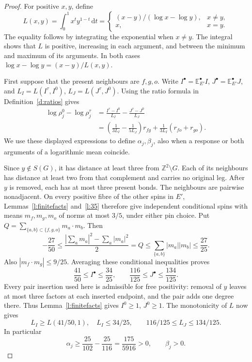 \begin{proof}
For positive \(x,y\), define
\[
 L(x,y)=\int_0^1x^t y^{1-t}\,\mathrm dt
 =\begin{cases}
 (x-y)/(\log x-\log y),&x\ne y,\\
 x,&x=y.
 \end{cases}
\]
The equality follows by integrating the exponential when \(x\ne y\).
The integral shows that \(L\) is positive, increasing in each argument,
and between the minimum and maximum of its arguments. In both cases
\(\log x-\log y=(x-y)/L(x,y)\).

First suppose that the present neighbours are \(f,g,o\).
Write \(I^\bullet=\mathbb E^\bullet_{E'}I\),
\(J^\bullet=\mathbb E^\bullet_{E'}J\), and
\(L_I=L(I^\tau,I^0)\), \(L_J=L(J^\tau,J^0)\).
Using the ratio formula in Definition~\ref{d:ratios} gives
\[
 \begin{split}
 \log\rho_j^0-\log\rho_j^\tau
 &=\frac{I^\tau-I^0}{L_I}
       -\frac{J^\tau-J^0}{L_J}\\
 &=\left(\frac1{3L_I}-\frac1{5L_J}\right)r_{fg}
       +\frac1{3L_I}(r_{fo}+r_{go}).
 \end{split}
\]
We use these displayed expressions to define \(\alpha_j,\beta_j\),
also when a response or both arguments of a logarithmic mean coincide.

Since \(y\notin S(G)\), it has distance at least three from
\(\mathbb Z^2\setminus G\). Each of its neighbours has distance
at least two from that complement and carries no original leg.
After \(y\) is removed, each has at most three present bonds.
The neighbours are pairwise nonadjacent. On every positive fibre
of the other spins in \(E'\), Lemmas~\ref{l:finitefacts}
and~\ref{l:35} therefore give independent conditional spins with
means \(m_f,m_g,m_o\) of norms at most \(3/5\), under either
pin choice. Put \(Q=\sum_{\{a,b\}\subset\{f,g,o\}}m_a\cdot m_b\).
Then
\[
 -\frac{27}{50}\le
 \frac{|\sum_a m_a|^2-\sum_a|m_a|^2}{2}=Q
 \le\sum_{\{a,b\}}|m_a||m_b|\le\frac{27}{25}.
\]
Also \(|m_f\cdot m_g|\le9/25\).
Averaging these conditional inequalities proves
\[
 \frac{41}{50}\le I^\bullet\le\frac{34}{25},\qquad
 \frac{116}{125}\le J^\bullet\le\frac{134}{125}.
\]
Every pair insertion used here is admissible for free positivity:
removal of \(y\) leaves at most three factors at each inserted
endpoint, and the pair adds one degree there.
Thus Lemma~\ref{l:finitefacts} gives \(I^0\ge1\), \(J^0\ge1\).
The monotonicity of \(L\) now gives
\[
 L_I\ge L(41/50,1),\quad L_I\le34/25,\qquad
 116/125\le L_J\le134/125.
\]
In particular
\[
 \alpha_j\ge\frac{25}{102}-\frac{25}{116}
       =\frac{175}{5916}>0,\qquad \beta_j>0.
\]


\end{proof}
